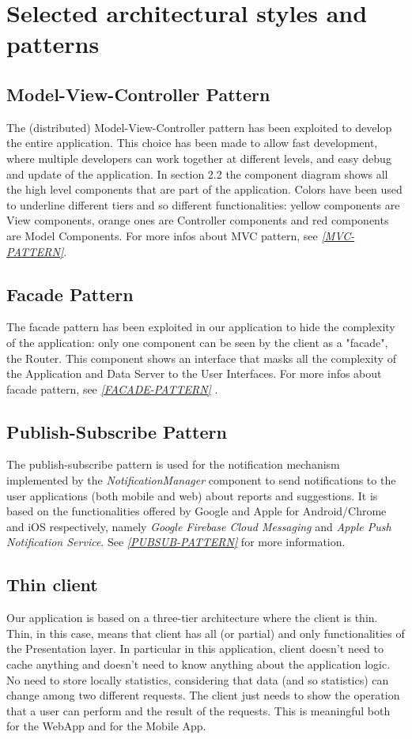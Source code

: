 \documentclass[a4paper]{report}
\begin{document}
\section{Selected architectural	styles and patterns}
\subsection{Model-View-Controller Pattern}
The (distributed) Model-View-Controller pattern has been exploited to develop the entire application.  This choice has been made to allow fast development, where multiple developers can work together at different levels, and easy debug and update of the application. In section 2.2 the component diagram shows all the high level components that are part of the application. Colors have been used to underline different tiers and so different functionalities: yellow components are View components, orange ones are Controller components and red components are Model Components. For more infos about MVC pattern, see \label{use:MVC-pattern} \hyperref[ref:MVC-pattern]{\textit{[MVC-PATTERN]}}.
\subsection{Facade Pattern}
The facade pattern has been exploited in our application to hide the complexity of the application: only one component can be seen by the client as a "facade", the Router. This component shows an interface that masks all the complexity of the Application and Data Server to the User Interfaces. For more infos about facade pattern, see \hyperref[ref:facade-pattern]{\textit{[FACADE-PATTERN]}} \label{use:facade-pattern}.
\subsection{Publish-Subscribe Pattern}
The publish-subscribe pattern is used for the notification mechanism implemented by the \textit{NotificationManager} component to send notifications to the user applications (both mobile and web) about reports and suggestions. It is based on the functionalities offered by Google and Apple for Android/Chrome and iOS respectively, namely \textit{Google Firebase Cloud Messaging} and \textit{Apple Push Notification Service}. \label{use:pubsub-pattern} See \hyperref[ref:pubsub-pattern]{\textit{[PUBSUB-PATTERN]}} for more information.
\subsection{Thin client}
Our application is based on a three-tier architecture where the client is thin. Thin, in this case, means that client has all (or partial) and only functionalities of the Presentation layer. In particular in this application, client doesn't need to cache anything and doesn't need to know anything about the application logic. No need to store locally statistics, considering that data (and so statistics) can change among two different requests. The client just needs to show the operation that a user can perform and the result of the requests. This is meaningful both for the WebApp and for the Mobile App. 
\end{document}
